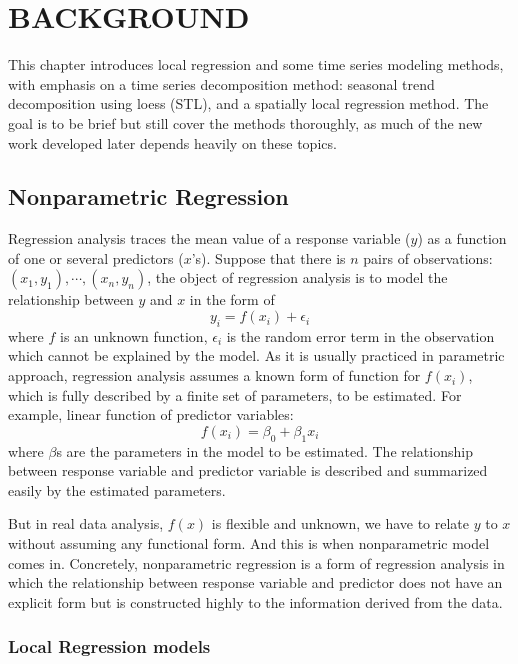 \chapter{BACKGROUND}

This chapter introduces local regression and some time series modeling methods,
with emphasis on a time series decomposition method: seasonal trend decomposition
using loess (STL), and a spatially local regression method. The goal is to be
brief but still cover the methods thoroughly, as much of the new work developed
later depends heavily on these topics.

\section{Nonparametric Regression}

Regression analysis traces the mean value of a response variable ($y$) as a 
function of one or several predictors ($x$'s). Suppose that there is $n$ pairs 
of observations: $(x_1, y_1), \cdots, (x_n, y_n)$, the object of regression 
analysis is to model the relationship between $y$ and $x$ in the form of
\begin{equation} 
y_i = f(x_i) + \epsilon_i
\end{equation} 
where $f$ is an unknown function, $\epsilon_i$ is the random error term in the
observation which cannot be explained by the model. 
As it is usually practiced in parametric approach, regression analysis assumes a 
known form of function for $f(x_i)$, which is fully described by a finite 
set of parameters, to be estimated. For example, linear function of predictor 
variables:
\begin{equation} 
f(x_i) = \beta_0 + \beta_1x_i
\end{equation} 
where $\beta$s are the parameters in the model to be estimated. The relationship 
between response variable and predictor variable is described and summarized 
easily by the estimated parameters.

But in real data analysis, $f(x)$ is flexible and unknown, we have to relate $y$ 
to $x$ without assuming any functional form. And this is when nonparametric 
model comes in. Concretely, nonparametric regression is a form 
of regression analysis in which the relationship between response variable and 
predictor does not have an explicit form but is constructed highly to the
information derived from the data.

\subsection{Local Regression models}

